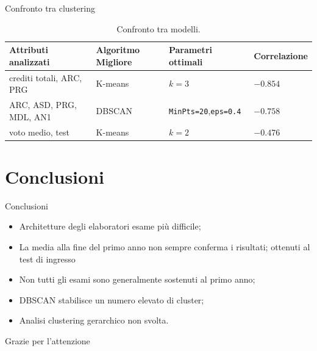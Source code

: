\documentclass{beamer}
\begin{document}
\begin{frame}{Confronto tra clustering}
\begin{table}[H]
\begin{adjustbox}{max width=\textwidth}
\begin{tabular}{@{}llll@{}}
\toprule
Attributi analizzati     & Algoritmo Migliore & Parametri ottimali & Correlazione \\ \midrule
crediti totali, ARC, PRG & K-means            & $k=3$                & $-0.854$       \\
ARC, ASD, PRG, MDL, AN1  & DBSCAN             & \texttt{MinPts=20},\texttt{eps=0.4}  & $-0.758$ \\
voto medio, test         & K-means            & $k=2$                & $-0.476$       \\ \bottomrule
\end{tabular}
\end{adjustbox}
\caption{Confronto tra modelli.}
\label{tab:mod-opt}
\end{table}
\end{frame}

\section{Conclusioni}

\begin{frame}{Conclusioni} 
    \begin{itemize}
      \item Architetture degli elaboratori esame più difficile;
      \item La media alla fine del primo anno non sempre conferma i risultati; ottenuti al test di ingresso
      \item Non tutti gli esami sono generalmente sostenuti al primo anno;
      \item DBSCAN stabilisce un numero elevato di cluster;
      \item Analisi clustering gerarchico non svolta.
    \end{itemize} 
\end{frame}

\begin{frame}
  \begin{center}
  \Huge Grazie per l'attenzione
  \end{center}
\end{frame}
\end{document}
